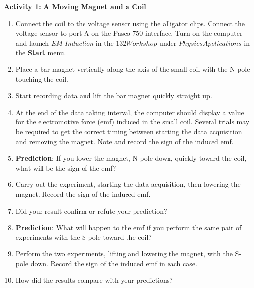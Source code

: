 \textbf{Activity 1: A Moving Magnet and a Coil}

\begin{enumerate}
\item Connect the coil to the voltage sensor using the alligator clips.  Connect the voltage sensor to port A on the Pasco 750 interface.
Turn on the computer and launch {\it EM Induction} in the $132 Workshop$ under $Physics Applications$ in the {\bf Start} menu.

\item Place a bar magnet vertically along the axis of the small coil with
the N-pole touching the coil.

\item Start recording data and lift the bar magnet quickly straight up.

\item At the end of the data taking interval, the computer should display
a value for the electromotive force (emf) induced in the small coil.
Several trials may be required to get the correct timing between starting
the data acquisition and removing the magnet. Note and record the sign of the 
induced emf.
\vspace{8mm}

\item \textbf{Prediction}: If you lower the magnet, N-pole down, quickly
toward the coil, what will be the sign of the emf? \vspace{8mm}

\item Carry out the experiment, starting the data acquisition, then lowering the magnet.
Record the sign of the induced emf.\vspace{10mm}

\item Did your result confirm or refute your prediction?\vspace{15mm}

\item \textbf{Prediction}: What will happen to the emf if you perform the
same pair of experiments with the S-pole toward the coil? \vspace{10mm}

\item Perform the two experiments, lifting and lowering the magnet, with
the S-pole down. Record the sign of the induced emf in each case.\vspace{10mm}

\item How did the results compare with your predictions?\vspace{10mm}

\end{enumerate}

